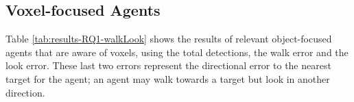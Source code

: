    



\subsection{Voxel-focused Agents}\label{appendix:RQ1-results-noknowledgeofvoxels}

Table \ref{tab:results-RQ1-walkLook} shows the results of relevant object-focused agents that are aware of voxels, using the total detections, the walk error and the look error. These last two errors represent the directional error to the nearest target for the agent; an agent may walk towards a target but look in another direction.
